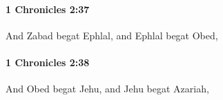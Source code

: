 		\paragraph{1 Chronicles 2:37} %
			\label{1CHRONICLES-2-37}

			And Zabad begat Ephlal, and Ephlal begat Obed,


		\paragraph{1 Chronicles 2:38} %
			\label{1CHRONICLES-2-38}

			And Obed begat Jehu, and Jehu begat Azariah,


